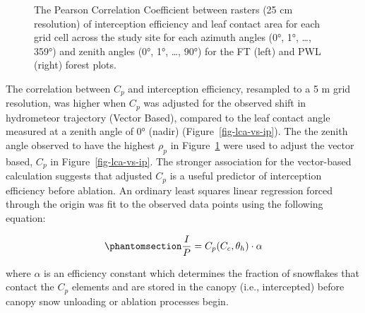 \documentclass[
  letterpaper,
  DIV=11,
  numbers=noendperiod]{scrartcl}
\begin{document}
\begin{figure}[H]


\caption{\label{fig-hemi-ip-cc}The Pearson Correlation Coefficient
between rasters (25 cm resolution) of interception efficiency and leaf
contact area for each grid cell across the study site for each azimuth
angles (0°, 1°, \ldots, 359°) and zenith angles (0°, 1°, \ldots, 90°)
for the FT (left) and PWL (right) forest plots.}

\end{figure}%

The correlation between \(C_p\) and interception efficiency, resampled
to a 5 m grid resolution, was higher when \(C_p\) was adjusted for the
observed shift in hydrometeor trajectory (Vector Based), compared to the
leaf contact angle measured at a zenith angle of 0° (nadir)
(Figure~\ref{fig-lca-vs-ip}). The the zenith angle observed to have the
highest \(\rho_p\) in Figure~\ref{fig-hemi-ip-cc} were used to adjust
the vector based, \(C_p\) in Figure~\ref{fig-lca-vs-ip}. The stronger
association for the vector-based calculation suggests that adjusted
\(C_p\) is a useful predictor of interception efficiency before
ablation. An ordinary least squares linear regression forced through the
origin was fit to the observed data points using the following equation:

\begin{equation}\phantomsection\label{eq-lca-ip}{
  \frac{I}{P} = C_p(C_c, \theta_h) \cdot \alpha
}\end{equation}

where \(\alpha\) is an efficiency constant which determines the fraction
of snowflakes that contact the \(C_p\) elements and are stored in the
canopy (i.e., intercepted) before canopy snow unloading or ablation
processes begin.
\end{document}
